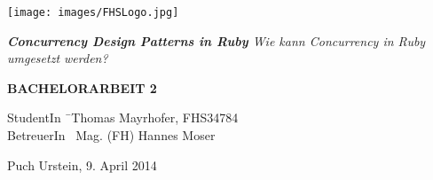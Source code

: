\begin{titlepage}
\begin{center}

\texttt{[image: images/FHSLogo.jpg]}

\vspace*{4cm}

\Large{
	\textit{
		\textbf{Concurrency Design Patterns in Ruby} 
		\linebreak 
		Wie kann Concurrency in Ruby umgesetzt werden?
	}
}

\vspace*{4cm}

\large{
	\textbf{BACHELORARBEIT 2}
}

\end{center}

\vfill

\begin{tabbing}
StudentIn \= \ Thomas Mayrhofer, FHS34784 \\
BetreuerIn \> \ Mag. (FH) Hannes Moser
\end{tabbing}

Puch Urstein, 9. April 2014

\end{titlepage}